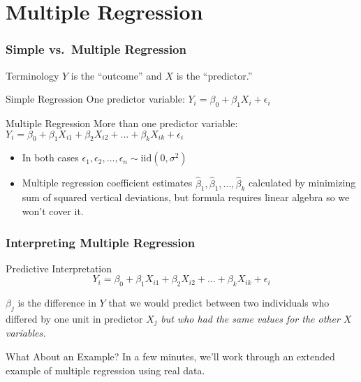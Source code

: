 \section{Multiple Regression}
\begin{frame}
\frametitle{Simple vs.\ Multiple Regression}
\begin{block}{Terminology}
$Y$ is the ``outcome'' and $X$ is the ``predictor.''
\end{block}

\begin{block}{Simple Regression}
One predictor variable: $Y_i = \beta_0 + \beta_1 X_i + \epsilon_i$
\end{block}
\begin{block}{Multiple Regression}
More than one predictor variable: $Y_i = \beta_0 + \beta_1 X_{i1} + \beta_2 X_{i2} +  \hdots + \beta_k X_{ik} + \epsilon_i$
\end{block}


\begin{itemize}
	\item In both cases $\epsilon_1, \epsilon_2, \hdots, \epsilon_n \sim \mbox{iid} (0,\sigma^2)$
	\item Multiple regression coefficient estimates $\widehat{\beta}_1, \widehat{\beta}_1, \hdots, \widehat{\beta}_k$ calculated by minimizing  sum of squared vertical deviations, but formula requires linear algebra so we won't cover it.
\end{itemize}
\end{frame}


\begin{frame}
\frametitle{Interpreting Multiple Regression}

\begin{block}{Predictive Interpretation}
$$Y_i = \beta_0 + \beta_1 X_{i1} + \beta_2 X_{i2} +  \hdots + \beta_k X_{ik} + \epsilon_i$$

$\beta_j$ is the difference in $Y$ that we would predict between two individuals who differed by one unit in predictor $X_j$ \emph{\alert{but who had the same values for the other $X$ variables.}} 

\end{block}

\begin{block}{What About an Example?}
	In a few minutes, we'll work through an extended example of multiple regression using real data.
\end{block}
\end{frame}

